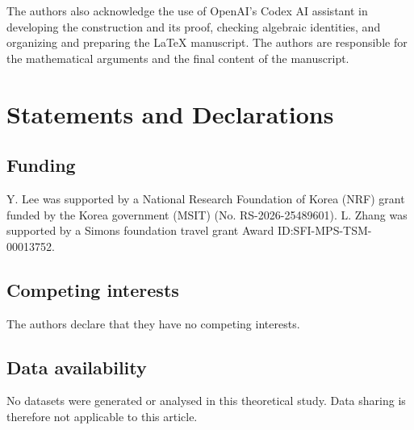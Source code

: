 \documentclass[11pt,reqno]{amsart}
\numberwithin{equation}{section}
\theoremstyle{definition}
\theoremstyle{remark}
\begin{document}
The authors also acknowledge the use of OpenAI's Codex AI assistant
in developing the construction and its proof, checking algebraic
identities, and organizing and preparing the \LaTeX{} manuscript.
The authors are responsible for the mathematical arguments and the
final content of the manuscript.


\section*{Statements and Declarations}



\subsection*{Funding}
Y. Lee was supported by a National Research Foundation of Korea (NRF) grant funded by the Korea government (MSIT) (No. RS-2026-25489601). L. Zhang was supported by a Simons foundation travel grant Award ID:SFI-MPS-TSM-00013752. 

\subsection*{Competing interests}
The authors declare that they have no competing interests.

\subsection*{Data availability}
No datasets were generated or analysed in this theoretical study.
Data sharing is therefore not applicable to this article.
\end{document}
